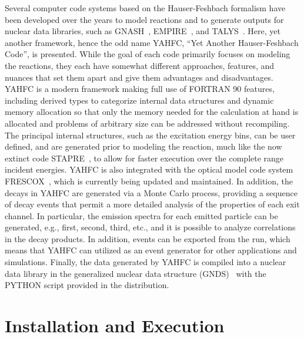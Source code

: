 \documentclass[
10pt,
showpacs,preprintnumbers,footinbib,
amsfonts,amsmath,amssymb,
aps,
prc,twocolumn,groupedaddress,superscriptaddress,
showkeys,
nofootinbib
]{revtex4-1}
\begin{document}
Several computer code systems based on the Hauser-Feshbach formalism have been developed over the years to model reactions and to generate outputs for nuclear data libraries, such as GNASH~\cite{GNASH}, EMPIRE~\cite{EMPIRE}, and TALYS~\cite{TALYS}. Here, yet another framework, hence the odd name YAHFC, ``Yet Another Hauser-Feshbach Code'', is presented. While the goal of each code primarily focuses on modeling the reactions, they each have somewhat different approaches, features, and nuances that set them apart and give them advantages and disadvantages. YAHFC is a modern framework making full use of FORTRAN 90 features, including derived types to categorize internal data structures and dynamic memory allocation so that only the memory needed for the calculation at hand is allocated and problems of arbitrary size can be addressed without recompiling. The principal internal structures, such as the excitation energy bins, can be user defined, and are generated prior to modeling the reaction, much like the now extinct code STAPRE~\cite{STAPRE}, to allow for faster execution over the complete range incident energies. YAHFC is also integrated with the optical model code system FRESCOX~\cite{FRESCO}, which is currently being updated and maintained. In addition, the decays in YAHFC are generated via a Monte Carlo process, providing a sequence of decay events that permit a more detailed analysis of the properties of each exit channel. In particular, the emission spectra for each emitted particle can be generated, e.g., first, second, third, etc., and it is possible to analyze correlations in the decay products. In addition, events can be exported from the run, which means that YAHFC can utilized as an event generator for other applications and simulations. Finally, the data generated by YAHFC is compiled into a nuclear data library in the generalized nuclear data structure (GNDS)~\cite{GNDS} with the PYTHON script provided in the distribution.

\section{Installation and Execution}
\end{document}
